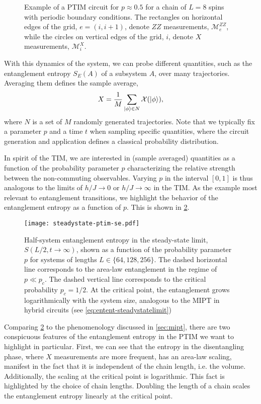 \begin{figure}[t]
  \centering
  
  \caption{Example of a PTIM circuit for $p\approx 0.5$ for a chain of $L=8$
  spins with periodic boundary conditions. The rectangles on horizontal edges
  of the grid, $e=(i,i+1)$, denote $ZZ$ measurements, $\mathcal{M}^{ZZ}_e$, while the circles
  on vertical edges of the grid, $i$, denote $X$ measurements, $\mathcal{M}^X_i$.
}
  \label{fig:ptim-circuit}
\end{figure}

With this dynamics of the system, we can probe different quantities, such as
the entanglement entropy $S_E(A)$ of a subsystem $A$, over many trajectories.
Averaging them defines the sample average,
\begin{align}
  X = \frac{1}{M} \sum_{\ket{\phi} \in N} \mathcal{X}(\ket{\phi})
,\end{align}
where $N$ is a set of $M$ randomly generated trajectories. Note that we
typically fix a parameter $p$ and a time $t$ when sampling specific quantities,
where the circuit generation and application defines a classical probability
distribution. 

In spirit of the TIM, we are interested in (sample averaged) quantities as a
function of the probability parameter $p$ characterizing the relative strength
between the non-commuting observables. Varying $p$ in the interval $[0,1]$ is
thus analogous to the limits of $h /J \to 0$ or  $h /J \to \infty$ in the TIM.
As the example most relevant to entanglement transitions, we highlight the
behavior of the entanglement entropy as a function of $p$. This is shown in
\cref{fig:phase-transition}.

\begin{figure}[t]
  \centering
  \texttt{[image: steadystate-ptim-se.pdf]}
  \caption{Half-system entanglement entropy in the steady-state limit, $S(L
  /2,t\to\infty)$, shown as a function of the probability parameter $p$ for
  systems of lengths $L\in\{64,128,256\}$. The
dashed horizontal line corresponds to the area-law entanglement in the regime
of $p\ll p_c$. The dashed vertical line corresponds to the critical probability
$p_c = 1 /2$. At the critical point, the entanglement grows logarithmically
with the system size, analogous to the MIPT in hybrid circuits (see
\cref{eq:entent-steadystatelimit})}
  \label{fig:phase-transition}
\end{figure}

Comparing \cref{fig:phase-transition} to the phenomenology discussed in
\cref{sec:mipt}, there are two conspicuous features of the entanglement entropy
in the PTIM we want to highlight in particular. First, we can see that the
entropy in the disentangling phase, where $X$ measurements are more frequent,
has an area-law scaling, manifest in the fact that it is independent of the
chain length, i.e. the volume. Additionally, the scaling at the critical point
is logarithmic. This fact is highlighted by the choice of chain lengths.
Doubling the length of a chain scales the entanglement entropy linearly at the
critical point.


